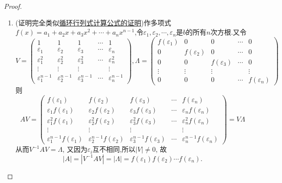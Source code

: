 \documentclass[../../main.tex]{subfiles}%
\begin{document}
\begin{proof}
\begin{enumerate}[(1)]
\item (证明完全类似\hyperref[proposition:循环行列式计算公式]{循环行列式计算公式的证明})作多项式\(f(x)=a_1 + a_2x + a_3x^2+\cdots + a_nx^{n - 1}\),令\(\varepsilon_1,\varepsilon_2,\cdots,\varepsilon_n\)是\(b\)的所有\(n\)次方根.又令
\[
V = 
\begin{pmatrix}
1 & 1 & 1 & \cdots & 1\\
\varepsilon_1 & \varepsilon_2 & \varepsilon_3 & \cdots & \varepsilon_n\\
\varepsilon_1^2 & \varepsilon_2^2 & \varepsilon_3^2 & \cdots & \varepsilon_n^2\\
\vdots & \vdots & \vdots & & \vdots\\
\varepsilon_1^{n - 1} & \varepsilon_2^{n - 1} & \varepsilon_3^{n - 1} & \cdots & \varepsilon_n^{n - 1}
\end{pmatrix},
\Lambda = 
\begin{pmatrix}
f(\varepsilon_1) & 0 & 0 & \cdots & 0\\
0 & f(\varepsilon_2) & 0 & \cdots & 0\\
0 & 0 & f(\varepsilon_3) & \cdots & 0\\
\vdots & \vdots & \vdots & & \vdots\\
0 & 0 & 0 & \cdots & f(\varepsilon_n)
\end{pmatrix}
\]
则
\[
AV = 
\begin{pmatrix}
f(\varepsilon_1) & f(\varepsilon_2) & f(\varepsilon_3) & \cdots & f(\varepsilon_n)\\
\varepsilon_1f(\varepsilon_1) & \varepsilon_2f(\varepsilon_2) & \varepsilon_3f(\varepsilon_3) & \cdots & \varepsilon_nf(\varepsilon_n)\\
\varepsilon_1^2f(\varepsilon_1) & \varepsilon_2^2f(\varepsilon_2) & \varepsilon_3^2f(\varepsilon_3) & \cdots & \varepsilon_n^2f(\varepsilon_n)\\
\vdots & \vdots & \vdots & & \vdots\\
\varepsilon_1^{n - 1}f(\varepsilon_1) & \varepsilon_2^{n - 1}f(\varepsilon_2) & \varepsilon_3^{n - 1}f(\varepsilon_3) & \cdots & \varepsilon_n^{n - 1}f(\varepsilon_n)
\end{pmatrix}
= V\Lambda
\]
从而$V^{-1}AV=\Lambda$,
又因为\(\varepsilon_i\)互不相同,所以\(|V|\neq0\),
故
\[
|A|=|V^{-1}AV| = |\Lambda| = f(\varepsilon_1)f(\varepsilon_2)\cdots f(\varepsilon_n).
\]
\end{enumerate}

\end{proof}
\end{document}
